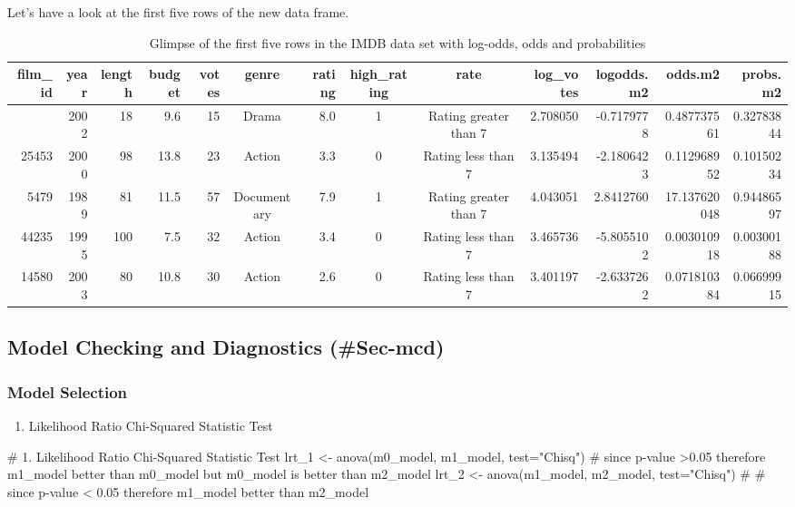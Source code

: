 \documentclass[
  letterpaper,
  DIV=11,
  numbers=noendperiod]{scrartcl}
\newenvironment{Shaded}{\begin{snugshade}}{\end{snugshade}}
\newcommand{\AttributeTok}[1]{\textcolor[rgb]{0.40,0.45,0.13}{#1}}
\newcommand{\CommentTok}[1]{\textcolor[rgb]{0.37,0.37,0.37}{#1}}
\newcommand{\FunctionTok}[1]{\textcolor[rgb]{0.28,0.35,0.67}{#1}}
\newcommand{\NormalTok}[1]{\textcolor[rgb]{0.00,0.23,0.31}{#1}}
\newcommand{\OtherTok}[1]{\textcolor[rgb]{0.00,0.23,0.31}{#1}}
\newcommand{\StringTok}[1]{\textcolor[rgb]{0.13,0.47,0.30}{#1}}
\providecommand{\tightlist}{%
  \setlength{\itemsep}{0pt}\setlength{\parskip}{0pt}}\usepackage{longtable,booktabs,array}
\begin{document}
Let's have a look at the first five rows of the new data frame.

\hypertarget{tbl-dataset-final}{}
\begin{longtable}{rrrrrcrccrrrr}
\caption{\label{tbl-dataset-final}Glimpse of the first five rows in the IMDB data set with log-odds, odds
and probabilities }\tabularnewline

\toprule
film\_id & year & length & budget & votes & genre & rating & high\_rating & rate & log\_votes & logodds.m2 & odds.m2 & probs.m2 \\ 
\midrule\addlinespace[2.5pt]
31804 & 2002 & 18 & 9.6 & 15 & Drama & 8.0 & 1 & Rating greater than 7 & 2.708050 & -0.7179778 & 0.487737561 & 0.32783844 \\ 
25453 & 2000 & 98 & 13.8 & 23 & Action & 3.3 & 0 & Rating less than 7 & 3.135494 & -2.1806423 & 0.112968952 & 0.10150234 \\ 
5479 & 1989 & 81 & 11.5 & 57 & Documentary & 7.9 & 1 & Rating greater than 7 & 4.043051 & 2.8412760 & 17.137620048 & 0.94486597 \\ 
44235 & 1995 & 100 & 7.5 & 32 & Action & 3.4 & 0 & Rating less than 7 & 3.465736 & -5.8055102 & 0.003010918 & 0.00300188 \\ 
14580 & 2003 & 80 & 10.8 & 30 & Action & 2.6 & 0 & Rating less than 7 & 3.401197 & -2.6337262 & 0.071810384 & 0.06699915 \\ 
\bottomrule
\end{longtable}

\hypertarget{model-checking-and-diagnostics-sec-mcd}{%
\subsection{Model Checking and Diagnostics
(\#Sec-mcd)}\label{model-checking-and-diagnostics-sec-mcd}}

\hypertarget{Sec-ms}{%
\subsubsection{Model Selection}\label{Sec-ms}}

\begin{enumerate}
\def\labelenumi{\arabic{enumi}.}
\tightlist
\item
  Likelihood Ratio Chi-Squared Statistic Test
\end{enumerate}

\begin{Shaded}
\begin{Highlighting}[]
\CommentTok{\# 1. Likelihood Ratio Chi{-}Squared Statistic Test}
\NormalTok{lrt\_1 }\OtherTok{\textless{}{-}} \FunctionTok{anova}\NormalTok{(m0\_model, m1\_model, }\AttributeTok{test=}\StringTok{"Chisq"}\NormalTok{)}
\CommentTok{\# since p{-}value \textgreater{}0.05 therefore m1\_model better than m0\_model but m0\_model is better than m2\_model}
\NormalTok{lrt\_2 }\OtherTok{\textless{}{-}} \FunctionTok{anova}\NormalTok{(m1\_model, m2\_model, }\AttributeTok{test=}\StringTok{"Chisq"}\NormalTok{) }\CommentTok{\# \# since p{-}value \textless{} 0.05 therefore m1\_model better than m2\_model}
\end{Highlighting}
\end{Shaded}
\end{document}

